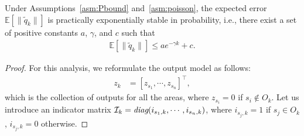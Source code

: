 \documentclass[letterpaper, 10 pt, conference]{ieeeconf}
\begin{document}
\begin{theorem}
Under Assumptions~\ref{asm:Pbound} and~\ref{asm:poisson}, the expected error $\mathbb{E}[\|\tilde{q}_k\|]$ is practically exponentially stable in probability, i.e., there exist a set of positive constants $a$, $\gamma$, and $c$ such that
\begin{align}
\mathbb{E}[\|\tilde{q}_k\|] \leq a e^{-\gamma k}+c.
\label{eq:exps}
\end{align}
\label{the:FRRFstability}
\end{theorem}
\begin{proof}
For this analysis, we reformulate the output model as follows:
\begin{align}
    z_k &= [z_{s_1},\cdots,z_{s_n}]^\top,
    \label{eq:newz}
\end{align}
which is the collection of outputs for all the areas, where $z_{s_i}=0$ if $s_i \notin O_k$.
Let us introduce an indicator matrix $\mathcal{I}_k = \operatorname*{\textit{diag}}( i_{s_1,k},\cdots,i_{s_n,k})$, where $i_{s_j,k}=1$ if $s_j \in O_k$, $i_{s_j,k}=0$ otherwise.


\end{proof}
\end{document}
